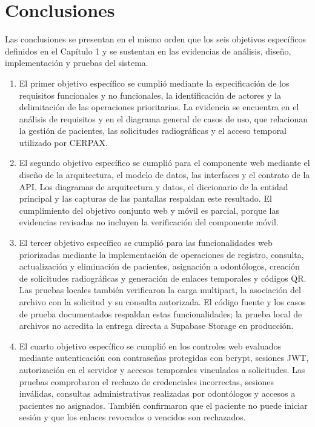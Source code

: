 \section{Conclusiones}

Las conclusiones se presentan en el mismo orden que los seis objetivos
específicos definidos en el Capítulo 1 y se sustentan en las evidencias
de análisis, diseño, implementación y pruebas del sistema.

\begin{enumerate}
    \item El primer objetivo específico se cumplió mediante la
    especificación de los requisitos funcionales y no funcionales,
    la identificación de actores y la delimitación de las operaciones
    prioritarias. La evidencia se encuentra en el análisis de requisitos
    y en el diagrama general de casos de uso, que relacionan la gestión
    de pacientes, las solicitudes radiográficas y el acceso temporal
    utilizado por CERPAX.

    \item El segundo objetivo específico se cumplió para el componente
    web mediante el diseño de la arquitectura, el modelo de datos,
    las interfaces y el contrato de la API. Los diagramas de arquitectura
    y datos, el diccionario de la entidad principal y las capturas de
    las pantallas respaldan este resultado. El cumplimiento del objetivo
    conjunto web y móvil es parcial, porque las evidencias revisadas
    no incluyen la verificación del componente móvil.

    \item El tercer objetivo específico se cumplió para las
    funcionalidades web priorizadas mediante la implementación de
    operaciones de registro, consulta, actualización y eliminación de
    pacientes, asignación a odontólogos, creación de solicitudes
    radiográficas y generación de enlaces temporales y códigos QR.
    Las pruebas locales también verificaron la carga multipart,
    la asociación del archivo con la solicitud y su consulta autorizada.
    El código fuente y los casos de prueba documentados respaldan
    estas funcionalidades; la prueba local de archivos no acredita
    la entrega directa a Supabase Storage en producción.

    \item El cuarto objetivo específico se cumplió en los controles
    web evaluados mediante autenticación con contraseñas protegidas
    con bcrypt, sesiones JWT, autorización en el servidor y accesos
    temporales vinculados a solicitudes. Las pruebas comprobaron
    el rechazo de credenciales incorrectas, sesiones inválidas,
    consultas administrativas realizadas por odontólogos y accesos
    a pacientes no asignados. También confirmaron que el paciente
    no puede iniciar sesión y que los enlaces revocados o vencidos
    son rechazados.


\end{enumerate}
